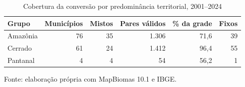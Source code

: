 \begin{table}[htbp]
\centering
\small
\caption{Cobertura da conversão por predominância territorial, 2001--2024}\label{tab:h1-cobertura}
\begin{tabular}{lrrrrr}
\hline
Grupo & Municípios & Mistos & Pares válidos & \% da grade & Fixos \\
\hline
Amazônia & 76 & 35 & 1.306 & 71,6 & 39 \\
Cerrado & 61 & 24 & 1.412 & 96,4 & 55 \\
Pantanal & 4 & 4 & 54 & 56,2 & 1 \\
\hline
\end{tabular}
\par\smallskip\begin{minipage}{\textwidth}\footnotesize
Fonte: elaboração própria com MapBiomas 10.1 e IBGE.
\end{minipage}
\end{table}
